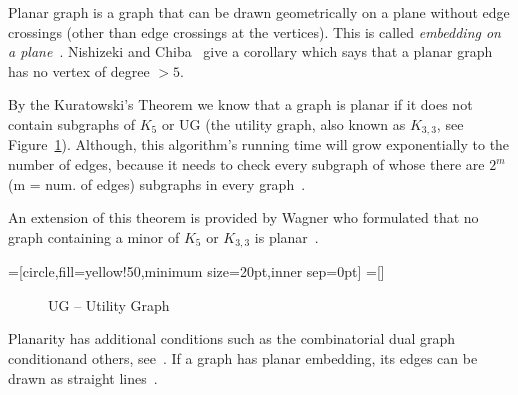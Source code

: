 Planar graph is a graph that can be drawn geometrically on a plane without edge crossings (other than edge
crossings at the vertices). This is called \textit{embedding on a plane}~\autocite[90]{deo1974graphs}. Nishizeki
and Chiba~\autocite[11]{nishizeki2008planar} give a corollary which says that a planar graph has no vertex of
degree $ > 5 $.

By the Kuratowski's Theorem we know that a graph is planar if it does not contain subgraphs
of $ K_5 $ or UG (the utility graph, also known as $ K_{3,3} $, see Figure~\ref{fig:uggraph}). Although, this algorithm's running time will
grow exponentially to the number of edges, because it needs to check every subgraph of whose there are $ 2^m $ 
(m = num. of edges) subgraphs in every graph~\autocite[23]{nishizeki2008planar}.

An extension of this theorem is provided by Wagner who formulated that no graph containing a minor of $ K_5 $ or $ K_{3,3} $ is planar~\autocite[307]{chartrand2010graphs}.

=[circle,fill=yellow!50,minimum size=20pt,inner sep=0pt]
=[]

\begin{figure}[h]
\caption{UG -- Utility Graph}
\label{fig:uggraph}
\end{figure}

Planarity has additional conditions such as the combinatorial dual graph conditionand others, 
see~\autocite{weisstein2009planar,weisstein1999dual}. If a graph has planar embedding, its edges can be drawn 
as straight lines~\autocite{fary1948,deo1974graphs,weisstein2009planar}.

